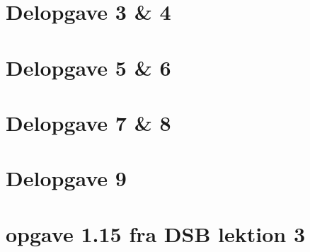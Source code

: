 \documentclass{article}
\begin{document}
\section{Delopgave 3 \& 4}



\section{Delopgave 5 \& 6}



\section{Delopgave 7 \& 8}



\section{Delopgave 9}



\section{opgave 1.15 fra DSB lektion 3}


\end{document}
